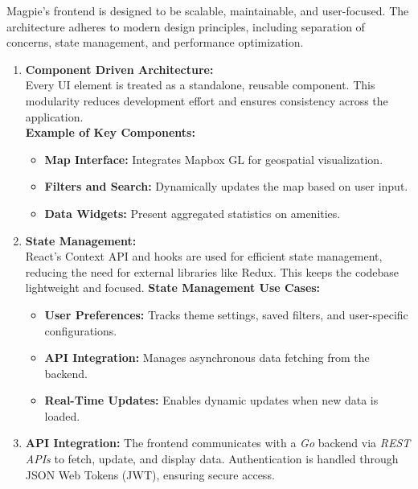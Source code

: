 \begin{enumerate}
    Magpie’s frontend is designed to be scalable, maintainable, and user-focused. The architecture adheres to modern design principles, including separation of concerns, state management, and performance optimization.\\
    \begin{enumerate}
        \item \textbf{Component Driven Architecture:}\\
        Every UI element is treated as a standalone, reusable component. This modularity reduces development effort and ensures consistency across the application.\\
        \textbf{Example of Key Components:}
        \begin{itemize}
            \item \textbf{Map Interface:} Integrates Mapbox GL for geospatial visualization.
            \item \textbf{Filters and Search:} Dynamically updates the map based on user input.
            \item \textbf{Data Widgets:} Present aggregated statistics on amenities.
        \end{itemize}
        \item \textbf{State Management:}\\
        React’s Context API and hooks are used for efficient state management, reducing the need for external libraries like Redux. This keeps the codebase lightweight and focused.
        \textbf{State Management Use Cases:}
        \begin{itemize}
            \item \textbf{User Preferences:} Tracks theme settings, saved filters, and user-specific configurations.
            \item \textbf{API Integration:} Manages asynchronous data fetching from the backend.
            \item \textbf{Real-Time Updates:} Enables dynamic updates when new data is loaded.
        \end{itemize}
        \item  \textbf{API Integration:}
        The frontend communicates with a \emph{Go} backend via \emph{REST APIs} to fetch, update, and display data. Authentication is handled through JSON Web Tokens (JWT), ensuring secure access.
    \end{enumerate}

\end{enumerate}